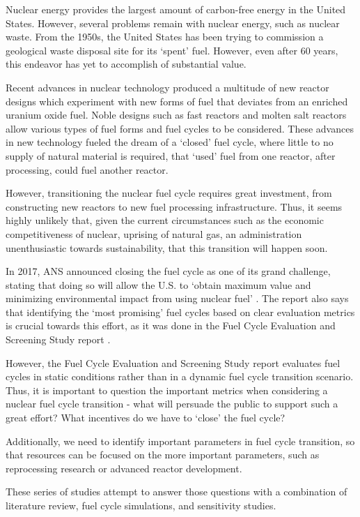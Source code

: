 Nuclear energy provides the largest amount of carbon-free energy
in the United States. However, several problems remain with nuclear
energy, such as nuclear waste.
From the 1950s, the United States has been trying to commission a
geological waste disposal site for its `spent' fuel. However, even
after 60 years, this endeavor has yet to accomplish of substantial value.

Recent advances in nuclear technology produced
a multitude of new reactor designs which experiment with new forms
of fuel that deviates from an enriched uranium oxide fuel.
Noble designs such as fast reactors and molten salt reactors
allow various types of fuel forms and fuel cycles to be considered. These advances in new
technology fueled the dream of a `closed' fuel cycle, where little to no
supply of natural material is required, that `used' fuel from one reactor,
after processing, could fuel another reactor.

However, transitioning the nuclear fuel cycle requires great investment,
from constructing new reactors to new fuel processing infrastructure.
Thus, it seems highly unlikely that, given the current circumstances
such as the economic competitiveness of nuclear, uprising of natural
gas, an administration unenthusiastic towards sustainability, that
this transition will happen soon.

In 2017, \gls{ANS} announced closing the fuel cycle as one of its
grand challenge, stating that doing so will allow the U.S.
to `obtain maximum value and minimizing environmental
impact from using nuclear fuel' \cite{_ans_2017}.
The report also says that identifying the `most promising'
fuel cycles based on clear evaluation metrics is crucial towards
this effort, as it was done in the Fuel Cycle Evaluation and Screening
Study report \cite{wigeland_nuclear_2014}.

However, the Fuel Cycle Evaluation and Screening Study report
evaluates fuel cycles in static conditions rather than
in a dynamic fuel cycle transition scenario.
Thus, it is important to question the important metrics when considering
a nuclear fuel cycle transition - what will persuade
the public to support such a great effort? What incentives
do we have to `close' the fuel cycle?

Additionally, we need to identify important parameters in
fuel cycle transition, so that resources can be
focused on the more important parameters, such as reprocessing
research or advanced reactor development.

These series of studies attempt to answer those questions with a
combination of literature review, fuel cycle simulations, and sensitivity
studies.
